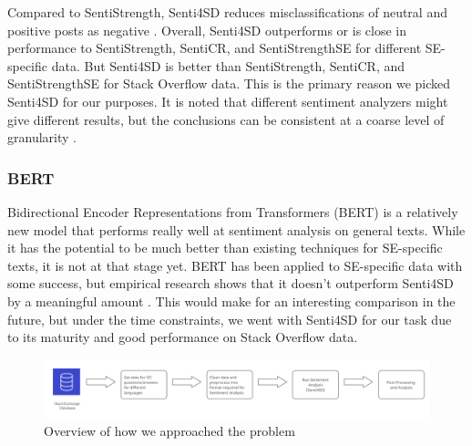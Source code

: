 \documentclass[conference]{IEEEtran}
\begin{document}
Compared to SentiStrength, Senti4SD reduces misclassifications of neutral and positive posts as negative \cite{b21}. Overall, Senti4SD outperforms or is close in performance to SentiStrength, SentiCR, and SentiStrengthSE for different SE-specific data\cite{b21, b26}. But Senti4SD is better than SentiStrength, SentiCR, and SentiStrengthSE for Stack Overflow data. This is the primary reason we picked Senti4SD for our purposes. It is noted that different sentiment analyzers might give different results, but the conclusions can be consistent at a coarse level of granularity \cite{b26}.\\

\subsubsection{BERT}
Bidirectional Encoder Representations from Transformers (BERT) is a relatively new model that performs really well at sentiment analysis on general texts\cite{b27}. While it has the potential to be much better than existing techniques for SE-specific texts, it is not at that stage yet. BERT has been applied to SE-specific data with some success\cite{b22}, but empirical research shows that it doesn't outperform Senti4SD by a meaningful amount \cite{b26}. This would make for an interesting comparison in the future, but under the time constraints, we went with Senti4SD for our task due to its maturity and good performance on Stack Overflow data. \\

\begin{figure}[tbp]
\centering
\includegraphics[width=\textwidth]{4710_method_summary.png}
\caption{Overview of how we approached the problem}
\label{fig}
\end{figure}
\end{document}
